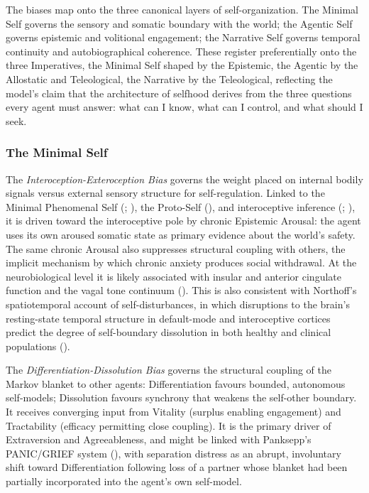 \documentclass[
  jou,
  floatsintext,
  longtable,
  nolmodern,
  notxfonts,
  notimes,
  12pt,
  colorlinks=true,linkcolor=blue,citecolor=blue,urlcolor=blue]{apa7}
\begin{document}
The biases map onto the three canonical layers of self-organization. The
Minimal Self governs the sensory and somatic boundary with the world;
the Agentic Self governs epistemic and volitional engagement; the
Narrative Self governs temporal continuity and autobiographical
coherence. These register preferentially onto the three Imperatives, the
Minimal Self shaped by the Epistemic, the Agentic by the Allostatic and
Teleological, the Narrative by the Teleological, reflecting the model's
claim that the architecture of selfhood derives from the three questions
every agent must answer: what can I know, what can I control, and what
should I seek.

\subsubsection{The Minimal Self}\label{the-minimal-self}

The \emph{Interoception-Exteroception Bias} governs the weight placed on
internal bodily signals versus external sensory structure for
self-regulation. Linked to the Minimal Phenomenal Self
(;
), the Proto-Self
(), and interoceptive
inference (;
), it is driven
toward the interoceptive pole by chronic Epistemic Arousal: the agent
uses its own aroused somatic state as primary evidence about the world's
safety. The same chronic Arousal also suppresses structural coupling
with others, the implicit mechanism by which chronic anxiety produces
social withdrawal. At the neurobiological level it is likely associated
with insular and anterior cingulate function and the vagal tone
continuum (). This is also consistent with Northoff's
spatiotemporal account of self-disturbances, in which disruptions to the
brain's resting-state temporal structure in default-mode and
interoceptive cortices predict the degree of self-boundary dissolution
in both healthy and clinical populations
().

The \emph{Differentiation-Dissolution Bias} governs the structural
coupling of the Markov blanket to other agents: Differentiation favours
bounded, autonomous self-models; Dissolution favours synchrony that
weakens the self-other boundary. It receives converging input from
Vitality (surplus enabling engagement) and Tractability (efficacy
permitting close coupling). It is the primary driver of Extraversion and
Agreeableness, and might be linked with Panksepp's PANIC/GRIEF system
(), with separation
distress as an abrupt, involuntary shift toward Differentiation
following loss of a partner whose blanket had been partially
incorporated into the agent's own self-model.
\end{document}
